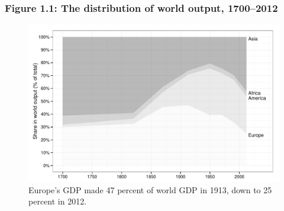 \documentclass[t]{beamer}\usepackage[]{graphicx}\usepackage[]{color}
\newenvironment{knitrout}{}{} %
\begin{document}
\begin{frame}[label=Figure_1_1]
\frametitle{Figure 1.1: The distribution of world output, 1700--2012}
\begin{figure}[t]
\begin{minipage}[b]{\textwidth}
\centering
\begin{knitrout}\footnotesize
{}\color{fgcolor}

{\centering \includegraphics[width=1\linewidth]{figures/bw/Figure_1_1} 

}



\end{knitrout}
\caption{Europe's GDP made 47 percent of world GDP in 1913, down to 25 percent in 2012.}
\end{minipage}
\end{figure}
\end{frame}
\end{document}
